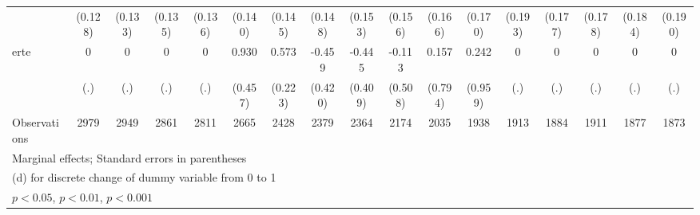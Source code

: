 {\begin{tabular}{l*{16}{c}}
                    &     (0.128)         &     (0.133)         &     (0.135)         &     (0.136)         &     (0.140)         &     (0.145)         &     (0.148)         &     (0.153)         &     (0.156)         &     (0.166)         &     (0.170)         &     (0.193)         &     (0.177)         &     (0.178)         &     (0.184)         &     (0.190)         \\
[1em]
erte                &           0         &           0         &           0         &           0         &       0.930\sym{*}  &       0.573\sym{*}  &      -0.459         &      -0.445         &      -0.113         &       0.157         &       0.242         &           0         &           0         &           0         &           0         &           0         \\
                    &         (.)         &         (.)         &         (.)         &         (.)         &     (0.457)         &     (0.223)         &     (0.420)         &     (0.409)         &     (0.508)         &     (0.794)         &     (0.959)         &         (.)         &         (.)         &         (.)         &         (.)         &         (.)         \\
\hline
Observations        &        2979         &        2949         &        2861         &        2811         &        2665         &        2428         &        2379         &        2364         &        2174         &        2035         &        1938         &        1913         &        1884         &        1911         &        1877         &        1873         \\
\hline\hline
\multicolumn{17}{l}{\footnotesize Marginal effects; Standard errors in parentheses}\\
\multicolumn{17}{l}{\footnotesize  (d) for discrete change of dummy variable from 0 to 1}\\
\multicolumn{17}{l}{\footnotesize \sym{*} \(p<0.05\), \sym{**} \(p<0.01\), \sym{***} \(p<0.001\)}\\
\end{tabular}
}
